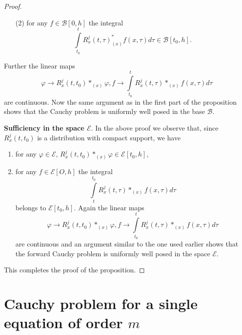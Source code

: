 \begin{proof}
\begin{itemize}
\item[(2)] for any $f \in \mathscr{B} [0, h]$ the integral
$$
\int\limits^{t}_{t_0} R^j _x (t,  \tau)^* _{(x)} f (x,  \tau) d\tau
\in \mathscr{B} [t_0 ,  h]. 
$$\pageoriginale
\end{itemize}

Further the linear maps 
\begin{equation}
\varphi \to R^j_x (t,  t_0) *_{(x)} \varphi ,  f \to
\int\limits^{t}_{t_0} R^j_x (t,  \tau) *_{(x)} f(x,  \tau ) d \tau
\tag{2.21}\label{chap2-eq2.21}   
\end{equation}
are continuous. Now the same argument as in the first part of the
proposition shows that the Cauchy problem is uniformly well posed in
the base $\mathscr{B}$.

\smallskip
\noindent
\textbf{Sufficiency in the space $\mathscr{E}$}. In the above proof
we observe that, since $R^j_x (t,  t_0)$ is a distribution with
compact support,  we have  
\begin{enumerate}[(1)]
\item for any $\varphi \in \mathscr{E}$, $R^j_x (t, t_0) *_{(x)}
  \varphi \in \mathscr{E} [t_0, h]$,  

\item for any $f \in \mathscr{E} [O,  h]$ the integral  
$$
\int\limits^{t_0}_{t} R^j_{x} (t,  \tau) *_{(x)} f (x, \tau) d\tau 
$$
belongs to $\mathscr{E} [t_0, h]$. Again the linear maps
$$
\varphi \to R^j_x (t,  t_0) *_{(x)} \varphi,  f \to
\int\limits_{t_0}^{t} R^j_x (t, \tau) *_{(x)} f (x, \tau) d\tau 
$$
are continuous and an argument similar to the one used earlier shows
that the forward Cauchy problem is uniformly well posed in the space
$\mathscr{E}$. 
\end{enumerate}

This completes the proof of the proposition.
\end{proof}

\section{Cauchy problem for a single equation of order
  $m$}\label{chap2-sec3} %

